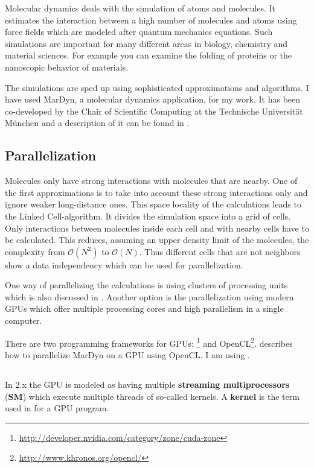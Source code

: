 Molecular dynamics deals with the simulation of atoms and molecules. It estimates the interaction between a high number of molecules and atoms using force fields which are modeled after quantum mechanics equations. 
Such simulations are important for many different areas in biology, chemistry and material sciences. For example you can examine the folding of proteins or the nanoscopic behavior of materials.

The simulations are sped up using sophisticated approximations and algorithms. I have used MarDyn, a molecular dynamics application, for my work. It has been co-developed by the Chair of Scientific Computing at the Technische Universit\"at M\"unchen and a description of it can be found in \cite{buchholz10framework}.

\subsection{Parallelization}
Molecules only have strong interactions with molecules that are nearby. One of the first approximations is to take into account these strong interactions only and ignore weaker long-distance ones.
This space locality of the calculations leads to the Linked Cell-algorithm. It divides the simulation space into a grid of cells. Only interactions between molecules inside each cell and with nearby cells have to be calculated. This reduces, assuming an upper density limit of the molecules,
 the complexity from $ \mathcal{O} \left( N^2 \right) $ to $ \mathcal{O} \left( N \right) $.
Thus different cells that are not neighbors show a data independency which can be used for parallelization.

One way of parallelizing the calculations is using clusters of processing units which is also discussed in \cite{buchholz10framework}. Another option is the parallelization using modern GPUs which offer multiple processing cores and high parallelism in a single computer.

There are two programming frameworks for GPUs: \cuda{}\footnote{\url{http://developer.nvidia.com/category/zone/cuda-zone}} and OpenCL\footnote{\url{http://www.khronos.org/opencl/}}.
\cite{orend10numerische} describes how to parallelize MarDyn on a GPU using OpenCL. I am using \cuda{}.

\subsection{\cuda{}}
In \cuda{} 2.x the GPU is modeled as having multiple \textbf{streaming multiprocessors} (\textbf{SM}) which execute multiple threads of so-called kernels. A \textbf{kernel} is the term used in \cuda{} for a GPU program.


